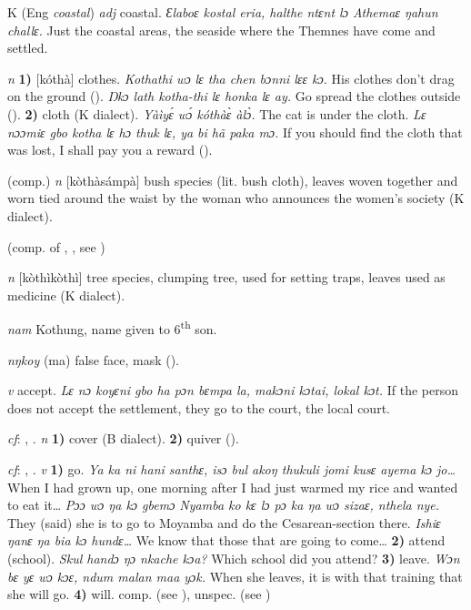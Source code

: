 \begin{letter}{K}
 (Eng \textit{coastal}) \textit{adj} coastal. \textit{Ɛlaboɛ kostal eria, halthe ntɛnt lɔ Athemaɛ ŋahun challɛ.} Just the coastal areas, the seaside where the Themnes have come and settled.

 \textit{n} \textbf{1)} [kóthà] clothes. \textit{Kothathi wɔ lɛ tha chen bɔnni lɛɛ kɔ.} His clothes don't drag on the ground (\citealt{Pichl1967}). \textit{Ŋkɔ lath kotha-thi lɛ honka lɛ ay.} Go spread the clothes outside (\citealt{Pichl1967}). \textbf{2)} cloth (K dialect). \textit{Yàìyɛ́ wɔ́ kóthàɛ̀ àlɔ̀.} The cat is under the cloth. \textit{Lɛ nɔɔmiɛ gbo kotha lɛ hɔ thuk lɛ, ya bi hã paka mɔ.} If you should find the cloth that was lost, I shall pay you a reward (\citealt{Pichl1967}). 

 (comp.) \textit{n} [kòthàsámpà] bush species (lit. bush cloth), leaves woven together and worn tied around the waist by the woman who announces the women's society (K dialect). 

 (comp. of , , see ) 

 \textit{n} [kòthìkòthì] tree species, clumping tree, used for setting traps, leaves used as medicine (K dialect). 

 \textit{nam} Kothung, name given to 6\textsuperscript{th} son.

 \textit{n}\textit{ŋkoy} (ma) false face, mask (\citealt{Pichl1967}). 

 \textit{v} accept. \textit{Lɛ nɔ koyɛni gbo ha pɔn bɛmpa la, makɔni kɔtai, lokal kɔt.} If the person does not accept the settlement, they go to the court, the local court.

 \textit{cf}: , . \textit{n} \textbf{1)} cover (B dialect). \textbf{2)} quiver (\citealt{Pichl1967}).

 \textit{cf}: , . \textit{v} \textbf{1)} go. \textit{Ya ka ni hani santhɛ, isɔ bul akoŋ thukuli jomi kusɛ ayema kɔ jo…} When I had grown up, one morning after I had just warmed my rice and wanted to eat it… \textit{Pɔɔ wɔ ŋa kɔ gbemɔ Nyamba ko kɛ lɔ pɔ ka ŋa wɔ sizaɛ, nthela nye.} They (said) she is to go to Moyamba and do the Cesarean-section there. \textit{Ishiɛ ŋanɛ ŋa bia kɔ hundɛ…} We know that those that are going to come… \textbf{2)} attend (school). \textit{Skul handɔ ŋɔ nkache kɔa?} Which school did you attend? \textbf{3)} leave. \textit{Wɔn bɛ yɛ wɔ kɔɛ, ndum malan maa yɔk.} When she leaves, it is with that training that she will go. \textbf{4)} will. comp.  (see ), unspec.  (see ) 


\end{letter}
